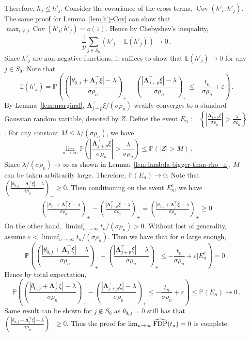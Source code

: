 \documentclass[11pt]{article}
\DeclareMathOperator{\Cov}{Cov}
\newcommand{\bLambda}{\boldsymbol{\Lambda}}
\newcommand{\FDP}{{\rm FDP}}
\newcommand{\Expected}{\mathbb{E}}
\newcommand{\Prob}{\mathbb{P}}
\begin{document}
Therefore, $h_j\leq h'_j$. Consider the covariance of the cross terms, $\Cov(h'_i;h'_j)$. The same proof for Lemma~\ref{lem:h'j-Cov} can show that $\max_{i\neq j}\Cov(h'_i;h'_j)=o(1)$. Hence by Chebyshev's inequality,
\[
\frac{1}{p}\sum_{j\in S_0}\left(h'_j-\Expected(h'_j)\right)\to 0\,.
\]
Since $h'_j$ are non-negative functions, it suffices to show that $\Expected(h'_j) \to 0$ for any $j\in S_0$. Note that 
\[
\Expected(h'_j) = \Prob\left(\left(\frac{|\theta_{0,j}+\bLambda_j^\top\xi|-\lambda}{\sigma\rho_n}\right)_+-\left(\frac{|\bLambda_{j+p}^\top\xi|-\lambda}{\sigma\rho_n}\right)_+\le -\frac{t_n}{\sigma\rho_n}+\varepsilon\right)\,.
\]
By Lemma~\ref{lem:marginal}, $\bLambda_{j+p}^\top\xi/(\sigma\rho_n)$ weakly converges to a standard Gaussian random variable, denoted by $Z$. Define the event $E_n :=\left\{\left|\frac{\bLambda_{j+p}^\top\xi}{\sigma\rho_n}\right|>\frac{\lambda}{\sigma\rho_n}\right\}$. For any constant $M\le\lambda/(\sigma\rho_n)$, we have
\[
\lim_{n\to\infty}\Prob\left(\left|\frac{\bLambda_{j+p}^\top\xi}{\sigma\rho_n}\right|>\frac{\lambda}{\sigma\rho_n}\right)\le \Prob\left(\left|Z\right|>M\right)\,.
\]
Since $\lambda/(\sigma\rho_n)\to\infty$ as shown in Lemma~\ref{lem:lambda-bigger-than-rho_n}, $M$ can be taken arbitrarily large. Therefore, $\Prob(E_n)\to0$. Note that $\left(\frac{|\theta_{0,j}+\bLambda_j^\top\xi|-\lambda}{\sigma\rho_n}\right)_+\ge0$. Then conditioning on the event $E_n^c$, we have
\begin{align*}
    \left(\frac{|\theta_{0,j}+\bLambda_j^\top\xi|-\lambda}{\sigma\rho_n}\right)_+-\left(\frac{|\bLambda_{j+p}^\top\xi|-\lambda}{\sigma\rho_n}\right)_+=\left(\frac{|\theta_{0,j}+\bLambda_j^\top\xi|-\lambda}{\sigma\rho_n}\right)_+\ge0
\end{align*}
On the other hand, $\liminf_{n\to\infty}t_n/(\sigma\rho_n)>0$. Without lost of generality, assume $\varepsilon<\liminf_{n\to\infty}t_n/(\sigma\rho_n)$. Then we have that for $n$ large enough,
\[
\Prob\left(\left(\frac{|\theta_{0,j}+\bLambda_j^\top\xi|-\lambda}{\sigma\rho_n}\right)_+-\left(\frac{|\bLambda_{j+p}^\top\xi|-\lambda}{\sigma\rho_n}\right)_+\le -\frac{t_n}{\sigma\rho_n}+\varepsilon\bigg\vert E_n^c\right)=0\,.
\]
Hence by total expectation,
\[
\Prob\left(\left(\frac{|\theta_{0,j}+\bLambda_j^\top\xi|-\lambda}{\sigma\rho_n}\right)_+-\left(\frac{|\bLambda_{j+p}^\top\xi|-\lambda}{\sigma\rho_n}\right)_+\le -\frac{t_n}{\sigma\rho_n}+\varepsilon\right)\le\Prob(E_n)\to0\,.
\]
Same result can be shown for $j\notin S_0$ as $\theta_{0,j}=0$ still has that $\left(\frac{|\theta_{0,j}+\bLambda_j^\top\xi|-\lambda}{\sigma\rho_n}\right)_+\ge0$. Thus the proof for $\lim_{n\to\infty}\widehat \FDP(t_n) = 0$ is complete.
\end{document}

